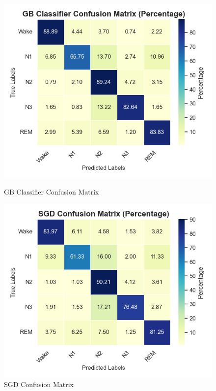 \begin{figure}[H]
	\vspace{1em}
	
	\begin{minipage}[b]{0.45\textwidth}
		\centering
		\includegraphics[width=\textwidth]{img/paper_1/GB Classifier_percentage_based.png}
		\caption{GB Classifier Confusion Matrix }
	\end{minipage}
	\hfill
	\begin{minipage}[b]{0.45\textwidth}
		\centering
		\includegraphics[width=\textwidth]{img/paper_1/SGD_percentage_based.png}
		\caption{SGD Confusion Matrix }
	\end{minipage}
\end{figure}


